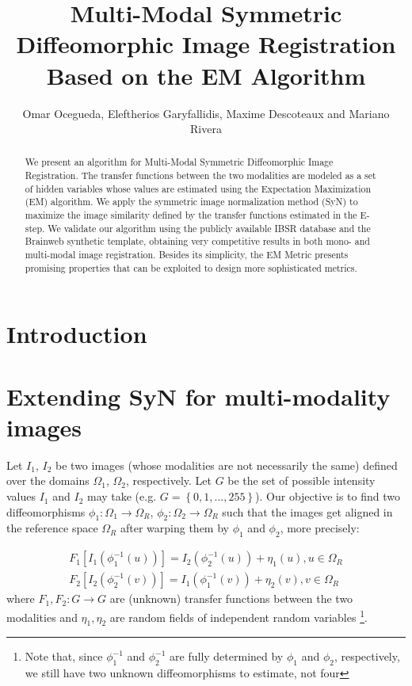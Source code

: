 \documentclass[11pt]{article}
\title{\textbf{Multi-Modal Symmetric Diffeomorphic Image Registration Based on the EM Algorithm}}
\date{}
\author{Omar Ocegueda, Eleftherios Garyfallidis, Maxime Descoteaux and Mariano Rivera}
\begin{document}
\maketitle
\begin{abstract}
    We present an algorithm for Multi-Modal Symmetric Diffeomorphic Image Registration. The transfer functions between the two modalities are modeled as a set of hidden variables whose values are estimated using the Expectation Maximization (EM) algorithm. We apply the symmetric image normalization method (SyN) to maximize the image similarity defined by the transfer functions estimated in the E-step. We validate our algorithm using the publicly available IBSR database and the Brainweb synthetic template, obtaining very competitive results in both mono- and multi-modal image registration. Besides its simplicity, the EM Metric presents promising properties that can be exploited to design more sophisticated metrics.
\end{abstract}

\section{Introduction}


\section{Extending SyN for multi-modality images}

Let $I_1$, $I_2$ be two images (whose modalities are not necessarily the same) defined over the domains $\Omega_{1}$, $\Omega_{2}$, respectively. Let $G$ be the set of possible intensity values $I_1$ and $I_2$ may take (e.g. $G=\left\lbrace 0,1,...,255\right\rbrace$). Our objective is to find two diffeomorphisms $\phi_{1}:\Omega_{1}\rightarrow \Omega_{R}$, $\phi_{2}:\Omega_{2}\rightarrow \Omega_{R}$ such that the images get aligned in the reference space $\Omega_{R}$ after warping them by $\phi_1$ and $\phi_{2}$, more precisely:

\begin{align}\label{eq:SyNEM_gom_ref}
	F_{1}[I_{1}(\phi_{1}^{-1}(u))] = I_{2}(\phi_{2}^{-1}(u)) + \eta_{1}(u), u\in\Omega_{R} \\
    \nonumber F_{2}[I_{2}(\phi_{2}^{-1}(v))] = I_{1}(\phi_{1}^{-1}(v)) + \eta_{2}(v), v\in\Omega_{R}
\end{align}
where $F_{1}, F_{2}:G \rightarrow G$ are (unknown) transfer functions between the two modalities and $\eta_{1}, \eta_{2}$ are random fields of independent random variables \footnote{Note that, since $\phi_{1}^{-1}$ and $\phi_{2}^{-1}$ are fully determined by $\phi_{1}$ and $\phi_{2}$, respectively, we still have two unknown diffeomorphisms to estimate, not four}.\\
\end{document}
